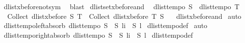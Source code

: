 \begin{isabellebody}
%
\isadelimproof
%
\endisadelimproof
%
\isatagproof
{}\isamarkupfalse%
\ dlist{\isacharunderscore}xbefore{\isacharunderscore}not{\isacharunderscore}sym\ \isamarkupfalse%
\ blast%
\endisatagproof
{\isafoldproof}%
%
\isadelimproof
\isanewline
%
\endisadelimproof
\isanewline
\isanewline
{}\isamarkupfalse%
\ dlistset{\isacharunderscore}xbefore{\isacharunderscore}and{\isacharcolon}\isanewline
\ \ {\isachardoublequoteopen}dlist{\isacharunderscore}tempo{}\ S\ {\isasymLongrightarrow}\ dlist{\isacharunderscore}tempo{}\ T\ {\isasymLongrightarrow}\isanewline
\ \ {\isacharparenleft}Collect\ {\isacharparenleft}dlist{\isacharunderscore}xbefore\ S\ T{\isacharparenright}{\isacharparenright}\ {\isasyminter}\ {\isacharparenleft}Collect\ {\isacharparenleft}dlist{\isacharunderscore}xbefore\ T\ S{\isacharparenright}{\isacharparenright}\ {\isacharequal}\ {\isacharbraceleft}{\isacharbraceright}{\isachardoublequoteclose}\isanewline
%
\isadelimproof
%
\endisadelimproof
%
\isatagproof
{}\isamarkupfalse%
\ dlist{\isacharunderscore}xbefore{\isacharunderscore}and\isanewline
{}\isamarkupfalse%
\ auto%
\endisatagproof
{\isafoldproof}%
%
\isadelimproof
\isanewline
%
\endisadelimproof
\isanewline
{}\isamarkupfalse%
\ dlist{\isacharunderscore}tempo{}{\isacharunderscore}left{\isacharunderscore}absorb{\isacharcolon}\ {\isachardoublequoteopen}dlist{\isacharunderscore}tempo{}\ S\ {\isasymLongrightarrow}\ S\ {\isacharparenleft}l{\isasymdagger}i{\isachardot}{\isachardot}{\isacharparenright}\ {\isasymLongrightarrow}\ S\ l{\isachardoublequoteclose}\isanewline
%
\isadelimproof
%
\endisadelimproof
%
\isatagproof
{}\isamarkupfalse%
\ dlist{\isacharunderscore}tempo{}{\isacharunderscore}def\isanewline
{}\isamarkupfalse%
\ auto%
\endisatagproof
{\isafoldproof}%
%
\isadelimproof
\isanewline
%
\endisadelimproof
\isanewline
{}\isamarkupfalse%
\ dlist{\isacharunderscore}tempo{}{\isacharunderscore}right{\isacharunderscore}absorb{\isacharcolon}\ {\isachardoublequoteopen}dlist{\isacharunderscore}tempo{}\ S\ {\isasymLongrightarrow}\ S\ {\isacharparenleft}l{\isasymdagger}{\isachardot}{\isachardot}i{\isacharparenright}\ {\isasymLongrightarrow}\ S\ l{\isachardoublequoteclose}\isanewline
%
\isadelimproof
%
\endisadelimproof
%
\isatagproof
{}\isamarkupfalse%
\ dlist{\isacharunderscore}tempo{}{\isacharunderscore}def\isanewline
{}\isamarkupfalse%

\end{isabellebody}
